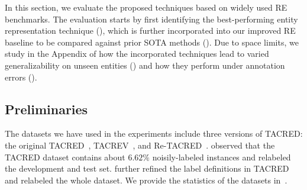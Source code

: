 \documentclass[11pt,a4paper]{article}
\newcommand{\stitle}[1]{\vspace{0.3em}\noindent{\bf #1}}
\begin{document}
In this section, we evaluate the proposed techniques based on widely used RE benchmarks. The evaluation starts by first identifying the best-performing entity representation technique (), which is further incorporated into our improved RE baseline to be compared against prior SOTA methods ().
Due to space limits, we study in the Appendix of how the incorporated techniques lead to varied generalizability on unseen entities () and how they perform under annotation errors ().

\subsection{Preliminaries}\label{ssec:exp_prelim}

\stitle{Datasets.} The datasets we have used in the experiments include three versions of TACRED: the original TACRED~\cite{zhang-etal-2017-position}, TACREV~\cite{alt-etal-2020-tacred}, and Re-TACRED~\cite{stoica2021re}.
\citet{alt-etal-2020-tacred} observed that the TACRED dataset contains about $6.62\%$ noisily-labeled instances and relabeled the development and test set.
\citet{stoica2021re} further refined the label definitions in TACRED and relabeled the whole dataset.
We provide the statistics of the datasets in~.
\end{document}

